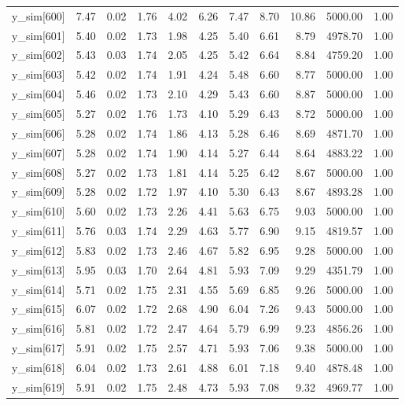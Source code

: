 \begin{table}[ht]
\begin{tabular}{rrrrrrrrrrr}
  y\_sim[600] & 7.47 & 0.02 & 1.76 & 4.02 & 6.26 & 7.47 & 8.70 & 10.86 & 5000.00 & 1.00 \\ 
  y\_sim[601] & 5.40 & 0.02 & 1.73 & 1.98 & 4.25 & 5.40 & 6.61 & 8.79 & 4978.70 & 1.00 \\ 
  y\_sim[602] & 5.43 & 0.03 & 1.74 & 2.05 & 4.25 & 5.42 & 6.64 & 8.84 & 4759.20 & 1.00 \\ 
  y\_sim[603] & 5.42 & 0.02 & 1.74 & 1.91 & 4.24 & 5.48 & 6.60 & 8.77 & 5000.00 & 1.00 \\ 
  y\_sim[604] & 5.46 & 0.02 & 1.73 & 2.10 & 4.29 & 5.43 & 6.60 & 8.87 & 5000.00 & 1.00 \\ 
  y\_sim[605] & 5.27 & 0.02 & 1.76 & 1.73 & 4.10 & 5.29 & 6.43 & 8.72 & 5000.00 & 1.00 \\ 
  y\_sim[606] & 5.28 & 0.02 & 1.74 & 1.86 & 4.13 & 5.28 & 6.46 & 8.69 & 4871.70 & 1.00 \\ 
  y\_sim[607] & 5.28 & 0.02 & 1.74 & 1.90 & 4.14 & 5.27 & 6.44 & 8.64 & 4883.22 & 1.00 \\ 
  y\_sim[608] & 5.27 & 0.02 & 1.73 & 1.81 & 4.14 & 5.25 & 6.42 & 8.67 & 5000.00 & 1.00 \\ 
  y\_sim[609] & 5.28 & 0.02 & 1.72 & 1.97 & 4.10 & 5.30 & 6.43 & 8.67 & 4893.28 & 1.00 \\ 
  y\_sim[610] & 5.60 & 0.02 & 1.73 & 2.26 & 4.41 & 5.63 & 6.75 & 9.03 & 5000.00 & 1.00 \\ 
  y\_sim[611] & 5.76 & 0.03 & 1.74 & 2.29 & 4.63 & 5.77 & 6.90 & 9.15 & 4819.57 & 1.00 \\ 
  y\_sim[612] & 5.83 & 0.02 & 1.73 & 2.46 & 4.67 & 5.82 & 6.95 & 9.28 & 5000.00 & 1.00 \\ 
  y\_sim[613] & 5.95 & 0.03 & 1.70 & 2.64 & 4.81 & 5.93 & 7.09 & 9.29 & 4351.79 & 1.00 \\ 
  y\_sim[614] & 5.71 & 0.02 & 1.75 & 2.31 & 4.55 & 5.69 & 6.85 & 9.26 & 5000.00 & 1.00 \\ 
  y\_sim[615] & 6.07 & 0.02 & 1.72 & 2.68 & 4.90 & 6.04 & 7.26 & 9.43 & 5000.00 & 1.00 \\ 
  y\_sim[616] & 5.81 & 0.02 & 1.72 & 2.47 & 4.64 & 5.79 & 6.99 & 9.23 & 4856.26 & 1.00 \\ 
  y\_sim[617] & 5.91 & 0.02 & 1.75 & 2.57 & 4.71 & 5.93 & 7.06 & 9.38 & 5000.00 & 1.00 \\ 
  y\_sim[618] & 6.04 & 0.02 & 1.73 & 2.61 & 4.88 & 6.01 & 7.18 & 9.40 & 4878.48 & 1.00 \\ 
  y\_sim[619] & 5.91 & 0.02 & 1.75 & 2.48 & 4.73 & 5.93 & 7.08 & 9.32 & 4969.77 & 1.00 \\ 

\end{tabular}
\end{table}
